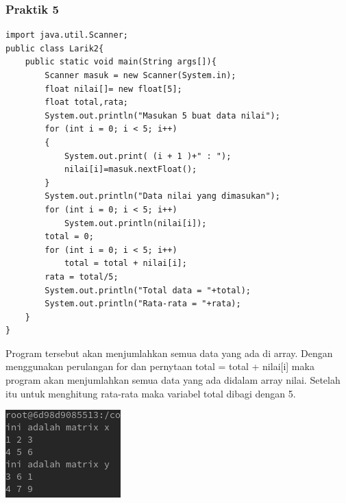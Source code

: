 \documentclass[a4paper,12pt]{article}
\begin{document}
\subsubsection{Praktik 5}
\begin{lstlisting}
import java.util.Scanner;
public class Larik2{
    public static void main(String args[]){
        Scanner masuk = new Scanner(System.in);
        float nilai[]= new float[5];
        float total,rata;
        System.out.println("Masukan 5 buat data nilai");
        for (int i = 0; i < 5; i++)
        {
            System.out.print( (i + 1 )+" : ");
            nilai[i]=masuk.nextFloat();
        }
        System.out.println("Data nilai yang dimasukan");
        for (int i = 0; i < 5; i++)
            System.out.println(nilai[i]);
        total = 0;
        for (int i = 0; i < 5; i++)
            total = total + nilai[i];
        rata = total/5;
        System.out.println("Total data = "+total);
        System.out.println("Rata-rata = "+rata);
    }
}
\end{lstlisting}
Program tersebut akan menjumlahkan semua data yang ada di array. Dengan menggunakan perulangan for dan pernytaan total = total + nilai[i] maka program akan menjumlahkan semua data yang ada 
didalam array nilai. Setelah itu untuk menghitung rata-rata maka variabel total dibagi dengan 5.
\begin{center}
    \includegraphics[scale=.7]{4.png}
\end{center}

\newpage
\end{document}
